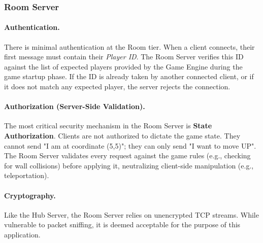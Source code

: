 \subsubsection{Room Server}

\paragraph{Authentication.}
There is minimal authentication at the Room tier. 
When a client connects, their first message must contain their \textit{Player ID}. 
The Room Server verifies this ID against the list of expected players provided by the Game Engine during the game startup phase. 
If the ID is already taken by another connected client, or if it does not match any expected player, the server rejects the connection. 

\paragraph{Authorization (Server-Side Validation).}
The most critical security mechanism in the Room Server is \textbf{State Authorization}. 
Clients are not authorized to dictate the game state. They cannot send "I am at coordinate (5,5)"; they can only send "I want to move UP". 
The Room Server validates every request against the game rules (e.g., checking for wall collisions) before applying it, neutralizing client-side manipulation (e.g., teleportation).

\paragraph{Cryptography.}
Like the Hub Server, the Room Server relies on unencrypted TCP streams. 
While vulnerable to packet sniffing, it is deemed acceptable for the purpose of this application.